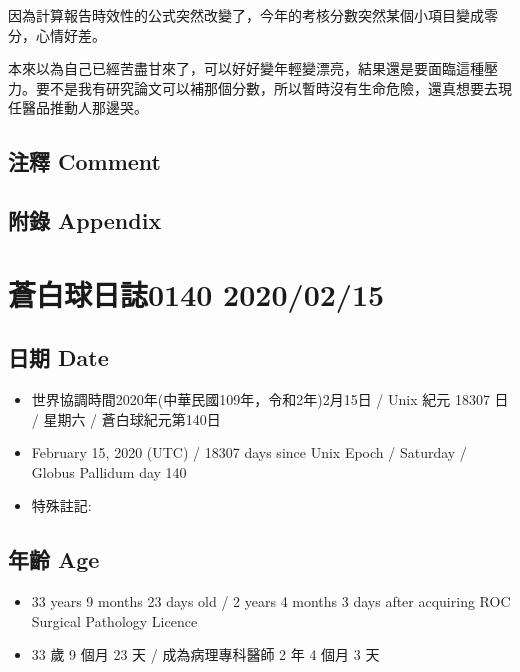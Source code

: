 \documentclass[
]{article}
\providecommand{\tightlist}{%
  \setlength{\itemsep}{0pt}\setlength{\parskip}{0pt}}
\begin{document}
因為計算報告時效性的公式突然改變了，今年的考核分數突然某個小項目變成零分，心情好差。

本來以為自己已經苦盡甘來了，可以好好變年輕變漂亮，結果還是要面臨這種壓力。要不是我有研究論文可以補那個分數，所以暫時沒有生命危險，還真想要去現任醫品推動人那邊哭。

\hypertarget{ux6ce8ux91cb-comment-74}{%
\subsection{注釋 Comment}\label{ux6ce8ux91cb-comment-74}}

\hypertarget{ux9644ux9304-appendix-75}{%
\subsection{附錄 Appendix}\label{ux9644ux9304-appendix-75}}

\hypertarget{ux84bcux767dux7403ux65e5ux8a8c0140-20200215}{%
\section{蒼白球日誌0140
2020/02/15}\label{ux84bcux767dux7403ux65e5ux8a8c0140-20200215}}

\hypertarget{ux65e5ux671f-date-76}{%
\subsection{日期 Date}\label{ux65e5ux671f-date-76}}

\begin{itemize}
\tightlist
\item
  世界協調時間2020年(中華民國109年，令和2年)2月15日 / Unix 紀元 18307 日
  / 星期六 / 蒼白球紀元第140日
\item
  February 15, 2020 (UTC) / 18307 days since Unix Epoch / Saturday /
  Globus Pallidum day 140
\item
  特殊註記:
\end{itemize}

\hypertarget{ux5e74ux9f61-age-76}{%
\subsection{年齡 Age}\label{ux5e74ux9f61-age-76}}

\begin{itemize}
\tightlist
\item
  33 years 9 months 23 days old / 2 years 4 months 3 days after
  acquiring ROC Surgical Pathology Licence
\item
  33 歲 9 個月 23 天 / 成為病理專科醫師 2 年 4 個月 3 天
\end{itemize}
\end{document}
